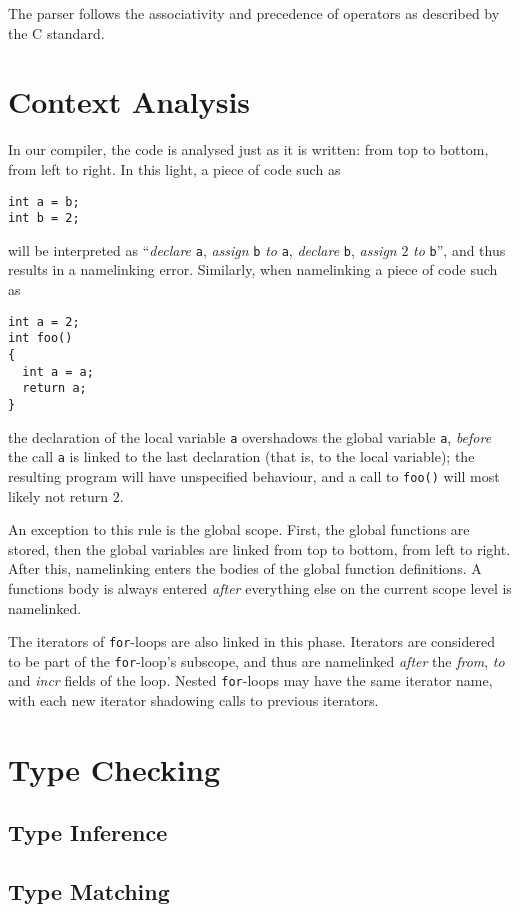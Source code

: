 \documentclass[a4paper,11pt]{report}
\begin{document}
The parser follows the associativity and precedence of operators as described by the C standard.

\section{Context Analysis}
In our compiler, the code is analysed just as it is written: from top to bottom, from left to right. In this light, a piece of code such as
\begin{verbatim}
int a = b;
int b = 2;
\end{verbatim}
will be interpreted as ``\emph{declare} \texttt{a}, \emph{assign} \texttt{b} \emph{to} \texttt{a}, \emph{declare} \texttt{b}, \emph{assign} $2$ \emph{to} \texttt{b}'', and thus results in a namelinking error. Similarly, when namelinking a piece of code such as
\begin{verbatim}
int a = 2;
int foo()
{
  int a = a;
  return a;
}
\end{verbatim}
the declaration of the local variable \texttt{a} overshadows the global variable \texttt{a}, \emph{before} the call \texttt{a} is linked to the last declaration (that is, to the local variable); the resulting program will have unspecified behaviour, and a call to \texttt{foo()} will most likely not return $2$.

An exception to this rule is the global scope. First, the global functions are stored, then the global variables are linked from top to bottom, from left to right. After this, namelinking enters the bodies of the global function definitions. A functions body is always entered \emph{after} everything else on the current scope level is namelinked.

The iterators of \texttt{for}-loops are also linked in this phase. Iterators are considered to be part of the \texttt{for}-loop's subscope, and thus are namelinked \emph{after} the \emph{from}, \emph{to} and \emph{incr} fields of the loop. Nested \texttt{for}-loops may have the same iterator name, with each new iterator shadowing calls to previous iterators.

\section{Type Checking}
\subsection{Type Inference}
\subsection{Type Matching}
\end{document}
